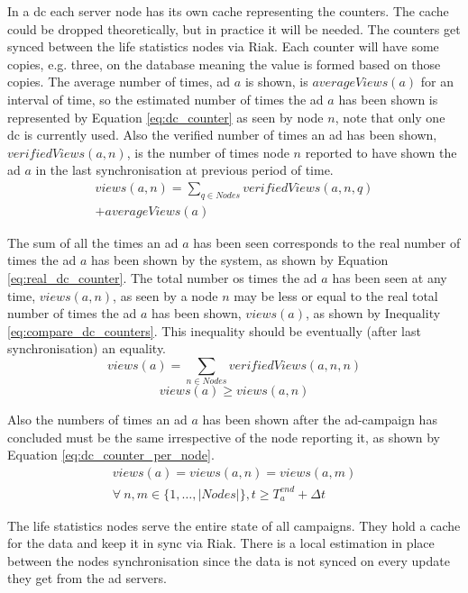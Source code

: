 In a \gls{dc} each server node has its own cache representing the counters. The cache could be dropped theoretically, but in practice it will be needed. The counters get synced between the life statistics nodes via Riak. Each counter will have some copies, e.g. three, on the database meaning the value is formed based on those copies. The average number of times, ad $a$ is shown, is $averageViews(a)$  for an interval of time, so the estimated number of times the ad $a$ has been shown is represented by Equation \ref{eq:dc_counter} as seen by node $n$, note that only one \gls{dc} is currently used. Also the verified number of times an ad has been shown, $ verifiedViews(a, n)$, is the number of times node $n$ reported to have shown the ad $a$ in the last synchronisation at previous period of time.
\begin{multline} \label{eq:dc_counter}
	views(a, n) = \sum_{q \in Nodes}  verifiedViews(a, n, q)\\ + averageViews(a)
\end{multline}

The sum of all the times an ad $a$ has been seen corresponds to the real number of times the ad $a$ has been shown by the system, as shown by Equation \ref{eq:real_dc_counter}. The total number os times the ad $a$ has been seen at any time, $views(a, n)$, as seen by a node $n$ may be less or equal to the real total number of times the ad $a$ has been shown, $views(a)$, as shown by Inequality \ref{eq:compare_dc_counters}. This inequality should be eventually (after last synchronisation) an equality.
\begin{equation} \label{eq:real_dc_counter}
	views(a) = \sum_{n \in Nodes}  verifiedViews(a, n, n)
\end{equation}
\begin{equation} \label{eq:compare_dc_counters}
	views(a) \ge views(a, n)
\end{equation}

Also the numbers of times an ad $a$ has been shown after the ad-campaign has concluded must be the same irrespective of the node reporting it, as shown by Equation \ref{eq:dc_counter_per_node}.
\begin{multline} \label{eq:dc_counter_per_node}
	views(a) = views(a, n) = views(a, m)\\ \forall ~ n, m \in \{1,\dots, |Nodes|\}, t \ge T^{end}_{a} + \Delta t
\end{multline}

The life statistics nodes serve the entire state of all campaigns. They hold a cache for the data and keep it in sync via Riak. There is a local estimation in place between the nodes synchronisation since the data is not synced on every update they get from the ad servers.



